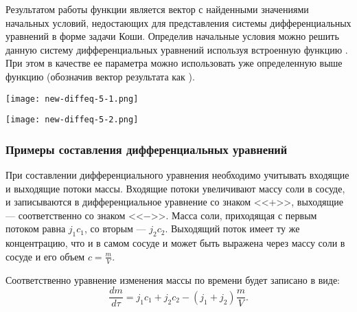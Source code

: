 Результатом работы функции  является вектор с найденными значениями начальных условий, недостающих для представления системы дифференциальных уравнений в форме задачи Коши. Определив начальные условия можно решить данную систему дифференциальных уравнений используя встроенную функцию .  При этом  в качестве  ее параметра  можно использовать уже определенную выше функцию  (обозначив вектор результата как ).

\begin{center}
	\texttt{[image: new-diffeq-5-1.png]}
\end{center}

\begin{center}
	\texttt{[image: new-diffeq-5-2.png]}
\end{center}

\subsubsection*{Примеры составления дифференциальных уравнений}

При составлении дифференциального уравнения необходимо учитывать входящие и выходящие потоки массы. Входящие потоки увеличивают массу соли в сосуде, и записываются в дифференциальное уравнение со знаком <<+>>, выходящие --- соответственно со знаком <<$-$>>. Масса соли, приходящая с первым потоком равна $j_1 c_1$, со вторым --- $j_2 c_2$. Выходящий поток имеет ту же концентрацию, что и в самом сосуде и может быть выражена через массу соли в сосуде и его объем $c=\frac{m}{V}$.

Соответственно уравнение изменения массы по времени будет записано в виде:
\begin{equation}
\dfrac{d m}{d \tau} = j_1 c_1 + j_2 c_2 - (j_1 + j_2 ) \dfrac{m}{V}.
\end{equation}

